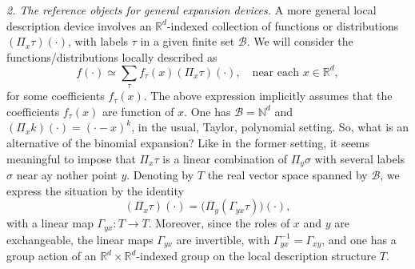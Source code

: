 \documentclass[10pt, reqno]{amsart}
\numberwithin{subsection}{section}
\numberwithin{subsubsection}{subsection}
\numberwithin{equation}{section} %
\theoremstyle{mystyle}
\theoremstyle{mystyle2}
\theoremstyle{mystyle3}
\newcommand{\ssk}{\smallskip}
\newcommand\bbN{\mathbb{N}}
\newcommand\bbR{\mathbb{R}}
\newcommand{\mcB}{\mathcal{B}}
\begin{document}
{\it 2. The reference objects for general expansion devices.} A more general local description device involves an $\bbR^d$-indexed collection of functions or distributions $(\Pi_x\tau)(\cdot)$, with labels $\tau$ in a given finite set $\mcB$. We will consider the functions/distributions locally described as
\begin{equation}   \label{EqLocalDescription3}
f(\cdot) \simeq \sum_\tau f_\tau(x)(\Pi_x\tau)(\cdot), \quad\textrm{near each }x\in\bbR^d,
\end{equation} 
for some coefficients $f_\tau(x)$. The above expression implicitly assumes that the coefficients $f_\tau(x)$ are function of $x$. One has $\mcB=\bbN^d$ and $(\Pi_xk)(\cdot) = (\cdot - x)^k$, in the usual, Taylor, polynomial setting. So, what is an alternative of the binomial expansion? Like in the former setting, it seems meaningful to impose that $\Pi_x\tau$ is a linear combination of $\Pi_y\sigma$ with several labels $\sigma$ near ay nother point $y$. Denoting by $T$ the real vector space spanned by $\mcB$, we express the situation by the identity
\begin{equation}  \label{EqTransitionMapsRelation}
(\Pi_x\tau)(\cdot) = \big(\Pi_y(\Gamma_{yx}\tau)\big)(\cdot),
\end{equation}
with a linear map $\Gamma_{yx} : T\rightarrow T$. Moreover, since the roles of $x$ and $y$ are exchangeable, the linear maps $\Gamma_{yx}$ are invertible, with $\Gamma_{yx}^{-1}=\Gamma_{xy}$, and one has a group action of an $\bbR^d\times\bbR^d$-indexed group on the local description structure $T$.   

\ssk
\end{document}
